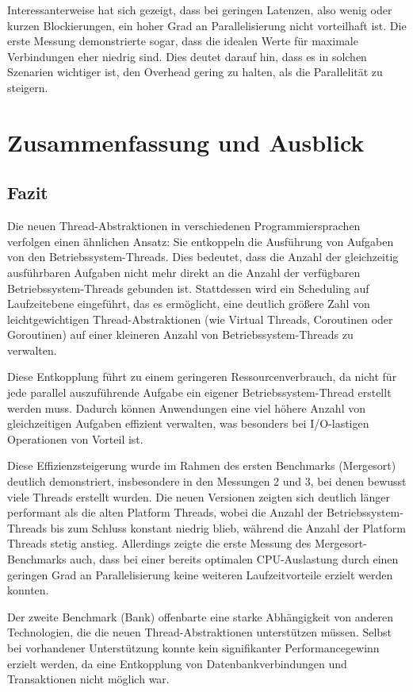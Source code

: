 \documentclass[fontsize=12pt,paper=a4,twoside=semi,parskip=half-,headsepline,headinclude]{scrreprt}
\begin{document}
Interessanterweise hat sich gezeigt, dass bei geringen Latenzen, also wenig oder kurzen Blockierungen, ein hoher Grad an Parallelisierung nicht vorteilhaft ist. Die erste Messung demonstrierte sogar, dass die idealen Werte für maximale Verbindungen eher niedrig sind. Dies deutet darauf hin, dass es in solchen Szenarien wichtiger ist, den Overhead gering zu halten, als die Parallelität zu steigern.

\chapter{Zusammenfassung und Ausblick}

\section{Fazit}

Die neuen Thread-Abstraktionen in verschiedenen Programmiersprachen verfolgen einen ähnlichen Ansatz: Sie entkoppeln die Ausführung von Aufgaben von den Betriebssystem-Threads. Dies bedeutet, dass die Anzahl der gleichzeitig ausführbaren Aufgaben nicht mehr direkt an die Anzahl der verfügbaren Betriebssystem-Threads gebunden ist. Stattdessen wird ein Scheduling auf Laufzeitebene eingeführt, das es ermöglicht, eine deutlich größere Zahl von leichtgewichtigen Thread-Abstraktionen (wie Virtual Threads, Coroutinen oder Goroutinen) auf einer kleineren Anzahl von Betriebssystem-Threads zu verwalten.

Diese Entkopplung führt zu einem geringeren Ressourcenverbrauch, da nicht für jede parallel auszuführende Aufgabe ein eigener Betriebssystem-Thread erstellt werden muss. Dadurch können Anwendungen eine viel höhere Anzahl von gleichzeitigen Aufgaben effizient verwalten, was besonders bei I/O-lastigen Operationen von Vorteil ist.

Diese Effizienzsteigerung wurde im Rahmen des ersten Benchmarks (Mergesort) deutlich demonstriert, insbesondere in den Messungen 2 und 3, bei denen bewusst viele Threads erstellt wurden. Die neuen Versionen zeigten sich deutlich länger performant als die alten Platform Threads, wobei die Anzahl der Betriebssystem-Threads bis zum Schluss konstant niedrig blieb, während die Anzahl der Platform Threads stetig anstieg. Allerdings zeigte die erste Messung des Mergesort-Benchmarks auch, dass bei einer bereits optimalen CPU-Auslastung durch einen geringen Grad an Parallelisierung keine weiteren Laufzeitvorteile erzielt werden konnten.

Der zweite Benchmark (Bank) offenbarte eine starke Abhängigkeit von anderen Technologien, die die neuen Thread-Abstraktionen unterstützen müssen. Selbst bei vorhandener Unterstützung konnte kein signifikanter Performancegewinn erzielt werden, da eine Entkopplung von Datenbankverbindungen und Transaktionen nicht möglich war.
\end{document}
